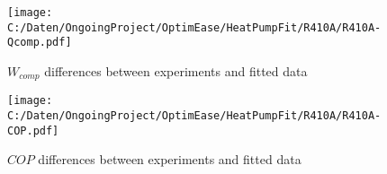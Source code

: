 \documentclass[english]{SPFShortReport}
\begin{document}
\begin{figure}[!htbp]
\begin{center}
\texttt{[image: C:/Daten/OngoingProject/OptimEase/HeatPumpFit/R410A/R410A-Qcomp.pdf]}
\caption{$W_{comp}$ differences between experiments and fitted data}
\label{QcompFig}
\end{center}
\end{figure}
\begin{figure}[!htbp]
\begin{center}
\texttt{[image: C:/Daten/OngoingProject/OptimEase/HeatPumpFit/R410A/R410A-COP.pdf]}
\caption{$COP$ differences between experiments and fitted data}
\label{COPFig}
\end{center}
\end{figure}
\end{document}
